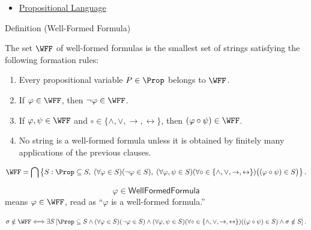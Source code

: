 \begin{dependencies}
\begin{itemize}
  \item \hyperref[def:propositional-language]{Propositional Language}
\end{itemize}
\end{dependencies}
\begin{definitionbox}{Definition (Well-Formed Formula)}
\begin{definition}
\label{def:well-formed-formula}
The set \(\WFF\) of well-formed formulas is the smallest set of strings satisfying the following formation rules:
\begin{enumerate}
\item Every propositional variable \(P\in\Prop\) belongs to \(\WFF\).
\item If \(\varphi\in\WFF\), then \(\neg\varphi\in\WFF\).
\item If \(\varphi,\psi\in\WFF\) and \(\circ\in\{\land,\lor,\to,\leftrightarrow\}\), then \((\varphi\circ\psi)\in\WFF\).
\item No string is a well-formed formula unless it is obtained by finitely many applications of the previous clauses.
\end{enumerate}
\end{definition}
\end{definitionbox}

\begin{remark*}
\[
\WFF
=
\bigcap
\left\{
S :
\Prop\subseteq S,\;
(\forall\varphi\in S)(\neg\varphi\in S),\;
(\forall\varphi,\psi\in S)
(\forall\circ\in\{\land,\lor,\to,\leftrightarrow\})
\bigl((\varphi\circ\psi)\in S\bigr)
\right\}.
\]
\end{remark*}

\begin{remark*}
\[
  \varphi\in\mathsf{WellFormedFormula}
\] means \(\varphi\in\WFF\), read as ``\(\varphi\) is a well-formed formula.''
\end{remark*}

\begin{remark*}
\[
\sigma\notin\WFF
\Longleftrightarrow
\exists S
\left[
\Prop\subseteq S
\land
(\forall\varphi\in S)(\neg\varphi\in S)
\land
(\forall\varphi,\psi\in S)
(\forall\circ\in\{\land,\lor,\to,\leftrightarrow\})
((\varphi\circ\psi)\in S)
\land
\sigma\notin S
\right].
\]
\end{remark*}

